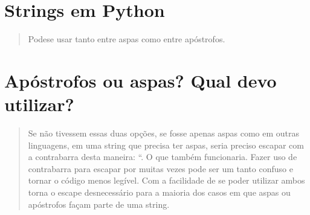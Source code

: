 \documentclass[letterpaper,10pt,brazil]{sphinxmanual}
\begin{document}
\section{Strings em Python}
\label{\detokenize{content/str:strings-em-python}}\begin{quote}

Pode\sphinxhyphen{}se usar tanto entre aspas como entre apóstrofos.
\end{quote}

\begin{sphinxVerbatim}[commandchars=\\\{\}]
  
\end{sphinxVerbatim}

\begin{sphinxVerbatim}[commandchars=\\\{\}]
  
\end{sphinxVerbatim}

\begin{sphinxVerbatim}[commandchars=\\\{\}]
  
\end{sphinxVerbatim}


\section{Apóstrofos ou aspas? Qual devo utilizar?}
\label{\detokenize{content/str:apostrofos-ou-aspas-qual-devo-utilizar}}\begin{quote}

Se não tivessem essas duas opções, se fosse apenas aspas como em outras linguagens, em uma string que precisa ter aspas, seria preciso escapar com a contrabarra desta maneira: “. O que também funcionaria.
Fazer uso de contrabarra para escapar por muitas vezes pode ser um tanto confuso e tornar o código menos legível.
Com a facilidade de se poder utilizar ambos torna o escape desnecessário para a maioria dos casos em que aspas ou apóstrofos façam parte de uma string.
\end{quote}
\end{document}
